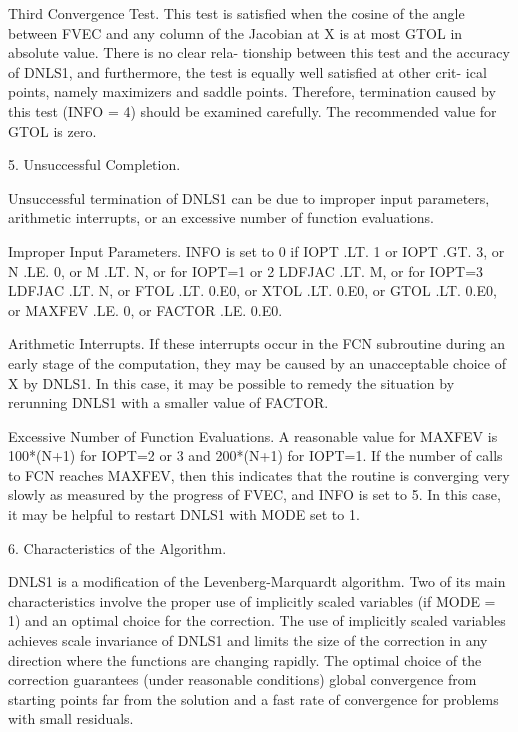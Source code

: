 \documentclass[11pt,twoside,nolof]{starlink}
\begin{document}
\begin{terminalv}
       Third Convergence Test.  This test is satisfied when the cosine
         of the angle between FVEC and any column of the Jacobian at X
         is at most GTOL in absolute value.  There is no clear rela-
         tionship between this test and the accuracy of DNLS1, and
         furthermore, the test is equally well satisfied at other crit-
         ical points, namely maximizers and saddle points.  Therefore,
         termination caused by this test (INFO = 4) should be examined
         carefully.  The recommended value for GTOL is zero.


 5. Unsuccessful Completion.

       Unsuccessful termination of DNLS1 can be due to improper input
       parameters, arithmetic interrupts, or an excessive number of
       function evaluations.

       Improper Input Parameters.  INFO is set to 0 if IOPT .LT. 1
         or IOPT .GT. 3, or N .LE. 0, or M .LT. N, or for IOPT=1 or 2
         LDFJAC .LT. M, or for IOPT=3 LDFJAC .LT. N, or FTOL .LT. 0.E0,
         or XTOL .LT. 0.E0, or GTOL .LT. 0.E0, or MAXFEV .LE. 0, or
         FACTOR .LE. 0.E0.

       Arithmetic Interrupts.  If these interrupts occur in the FCN
         subroutine during an early stage of the computation, they may
         be caused by an unacceptable choice of X by DNLS1.  In this
         case, it may be possible to remedy the situation by rerunning
         DNLS1 with a smaller value of FACTOR.

       Excessive Number of Function Evaluations.  A reasonable value
         for MAXFEV is 100*(N+1) for IOPT=2 or 3 and 200*(N+1) for
         IOPT=1.  If the number of calls to FCN reaches MAXFEV, then
         this indicates that the routine is converging very slowly
         as measured by the progress of FVEC, and INFO is set to 5.
         In this case, it may be helpful to restart DNLS1 with MODE
         set to 1.


 6. Characteristics of the Algorithm.

       DNLS1 is a modification of the Levenberg-Marquardt algorithm.
       Two of its main characteristics involve the proper use of
       implicitly scaled variables (if MODE = 1) and an optimal choice
       for the correction.  The use of implicitly scaled variables
       achieves scale invariance of DNLS1 and limits the size of the
       correction in any direction where the functions are changing
       rapidly.  The optimal choice of the correction guarantees (under
       reasonable conditions) global convergence from starting points
       far from the solution and a fast rate of convergence for
       problems with small residuals.


\end{terminalv}
\end{document}
